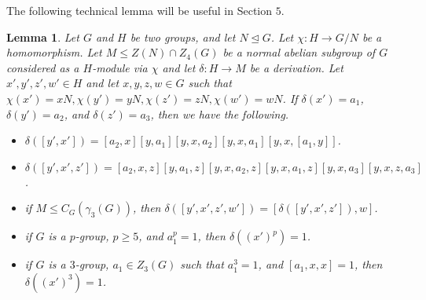 \documentclass[preprint,sort&compress,12pt]{elsarticle}
\newtheorem{lemma}[theorem]{Lemma}
\theoremstyle{definition}
\numberwithin{equation}{theorem}
\begin{document}
The following technical lemma will be useful in Section $5$.
\begin{lemma}\label{L:4.5}
Let $G$ and $H$ be two groups, and let $N\unlhd G$. Let $\chi: H\rightarrow G/N$ be a homomorphism. Let $M\le Z(N)\cap Z_4(G)$ be a normal abelian subgroup of $G$ considered as a $H$-module via $\chi$ and let $\delta:H\rightarrow M$ be a derivation. Let $x', y', z', w'\in H$ and let $x, y, z, w\in G$ such that $\chi(x')=xN, \chi(y')=yN, \chi(z')=zN, \chi(w')=wN$. If $\delta(x')=a_1$, $\delta(y')=a_2$, and $\delta(z')=a_3$, then we have the following.
\begin{itemize}
\item [$(i)$] $\delta([y', x'])=[a_2, x] [y, a_1] [y, x, a_2][y, x, a_1] [y, x, [a_1, y]]$.
\item [$(ii)$] $\delta([y', x', z'])= [a_2, x, z] [y, a_1, z] [y, x, a_2, z] [y, x, a_1, z] [y, x, a_3] [y, x, z, a_3]$.
\item [$(iii)$] if $M\le C_G(\gamma_3(G))$, then $\delta([y', x', z', w'])= [\delta([y', x', z']), w]$.
\item [$(iv)$] if $G$ is a $p$-group, $p\ge 5$, and $a_1^p=1$, then $\delta((x')^p)=1$.
\item [$(v)$] if $G$ is a $3$-group, $a_1\in Z_3(G)$ such that $a_1^3=1$, and $[a_1, x, x]=1$, then $\delta((x')^3)=1$.
\end{itemize}
\end{lemma}
\end{document}
